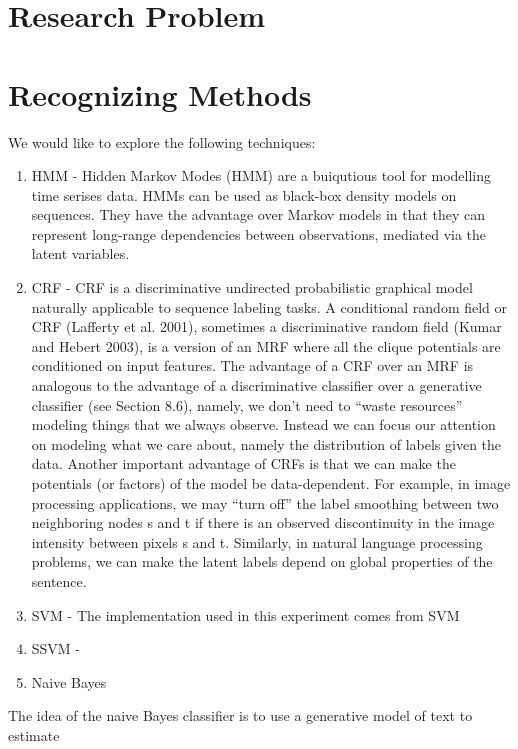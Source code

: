 \documentclass[11pt, oneside]{article}   	%
\begin{document}
\section{Research Problem}

\section{Recognizing Methods}
We would like to explore the following techniques:
	\begin{enumerate}
\item HMM - 
Hidden Markov Modes (HMM) are a buiqutious tool for modelling time serises  data.  HMMs can be used as black-box density models on sequences. They have the advantage over Markov models in that they can represent long-range dependencies between observations, mediated via the latent variables. 

\item CRF - 
CRF is a discriminative undirected probabilistic graphical model naturally applicable to sequence labeling tasks. A conditional random field or CRF (Lafferty et al. 2001), sometimes a discriminative random field (Kumar and Hebert 2003), is  a version of an MRF where all the clique potentials are conditioned on input features. The advantage of a CRF over an MRF is analogous to the advantage of a discriminative classifier over a generative classifier (see Section 8.6), namely, we don’t need to “waste resources” modeling things that we always observe. Instead we can focus our attention on modeling what we care about, namely the distribution of labels given the data.
Another important advantage of CRFs is that we can make the potentials (or factors) of the model be data-dependent. For example, in image processing applications, we may “turn off” the label smoothing between two neighboring nodes s and t if there is an observed discontinuity in the image intensity between pixels s and t. Similarly, in natural language processing problems, we can make the latent labels depend on global properties of the sentence. 

\item SVM - 
The implementation used in this experiment comes from SVM

\item SSVM - 

\item Naive Bayes
	\end{enumerate}
The idea of the naive Bayes classifier is to use a generative model of text to estimate
\end{document}
